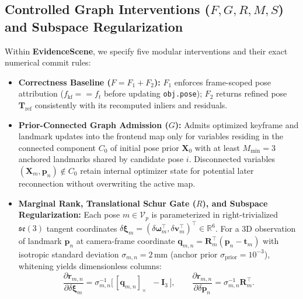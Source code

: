 \documentclass{evidencescene}
\begin{document}
\subsection{Controlled Graph Interventions ($F,G,R,M,S$) and Subspace Regularization}
\label{sec:gate_spec}
Within \textbf{EvidenceScene}, we specify five modular interventions and their exact numerical commit rules:
\begin{itemize}
    \item \textbf{Correctness Baseline ($F=F_1+F_2$):} $F_1$ enforces frame-scoped pose attribution ($f_{\mathrm{kf}}==f_t$ before updating \texttt{obj.pose}); $F_2$ returns refined pose $\mathbf{T}_{\mathrm{ref}}$ consistently with its recomputed inliers and residuals.
    \item \textbf{Prior-Connected Graph Admission ($G$):} Admits optimized keyframe and landmark updates into the frontend map only for variables residing in the connected component $C_0$ of initial pose prior $\mathbf{X}_0$ with at least $M_{\min}=3$ anchored landmarks shared by candidate pose $i$. Disconnected variables $(\mathbf{X}_m,\mathbf{p}_n)\notin C_0$ retain internal optimizer state for potential later reconnection without overwriting the active map.
    \item \textbf{Marginal Rank, Translational Schur Gate ($R$), and Subspace Regularization:} Each pose $m\in\mathcal{V}_p$ is parameterized in right-trivialized $\mathfrak{se}(3)$ tangent coordinates $\delta\boldsymbol{\xi}_m=(\delta\boldsymbol{\omega}_m^\top,\delta\mathbf{v}_m^\top)^\top\in\mathbb{R}^6$. For a 3D observation of landmark $\mathbf{p}_n$ at camera-frame coordinate $\mathbf{q}_{m,n}=\mathbf{R}_m^\top(\mathbf{p}_n-\mathbf{t}_m)$ with isotropic standard deviation $\sigma_{m,n}=2\,\mathrm{mm}$ (anchor prior $\sigma_{\mathrm{prior}}=10^{-3}$), whitening yields dimensionless columns:
    \begin{equation}
        \frac{\partial\mathbf{r}_{m,n}}{\partial\delta\boldsymbol{\xi}_m}=\sigma_{m,n}^{-1}\big[\,[\mathbf{q}_{m,n}]_\times \;\; -\mathbf{I}_3\,\big], \qquad
        \frac{\partial\mathbf{r}_{m,n}}{\partial\delta\mathbf{p}_n}=\sigma_{m,n}^{-1}\mathbf{R}_m^\top.
        \label{eq:whitened_jac}
    \end{equation}

\end{itemize}
\end{document}
